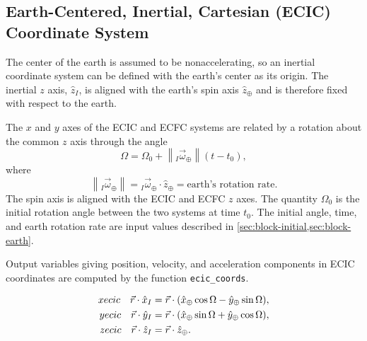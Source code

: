 \subsection{Earth-Centered, Inertial, Cartesian (ECIC) Coordinate System}\label{sec:ecic}

The center of the earth is assumed to be nonaccelerating, so an inertial coordinate
system can be defined with the earth's center as its origin. The inertial $z$ axis,
$\hat{z}_{I}$, is aligned with the earth's spin axis $\hat{z}_{\oplus}$ and is
therefore fixed with respect to the earth.

The $x$ and $y$ axes of the ECIC and ECFC systems are related by a rotation about
the common $z$ axis through the angle
\begin{equation}
  \Omega = \Omega_{0}
    + \left\lVert {}_{I}\vec{\omega}_{\oplus} \right\rVert (t-t_{0}),
  \label{eq:ecic-rotation-angle}
\end{equation}
where
\begin{equation}
  \left\lVert {}_{I}\vec{\omega}_{\oplus} \right\rVert
    = {}_{I}\vec{\omega}_{\oplus}\cdot\hat{z}_{\oplus}
    = \text{earth's rotation rate}.
  \label{eq:earth-rotation-rate}
\end{equation}
The spin axis is aligned with the ECIC and ECFC $z$ axes. The quantity $\Omega_0$
is the initial rotation angle between the two systems at time $t_0$. The initial angle,
time, and earth rotation rate are input values described in
\cref{sec:block-initial,sec:block-earth}.

Output variables giving position, velocity, and acceleration components in ECIC
coordinates are computed by the function \texttt{ecic\_coords}.

\begin{equation}
\begin{aligned}
  xecic\quad
  \vec{r}\cdot\hat{x}_{I}
    &= \vec{r}\cdot
       (\hat{x}_{\oplus}\cos\Omega-\hat{y}_{\oplus}\sin\Omega),\\
  yecic\quad
  \vec{r}\cdot\hat{y}_{I}
    &= \vec{r}\cdot
       (\hat{x}_{\oplus}\sin\Omega+\hat{y}_{\oplus}\cos\Omega),\\
  zecic\quad
  \vec{r}\cdot\hat{z}_{I}
    &= \vec{r}\cdot\hat{z}_{\oplus}.
\end{aligned}
\label{eq:ecic-position-components}
\end{equation}

